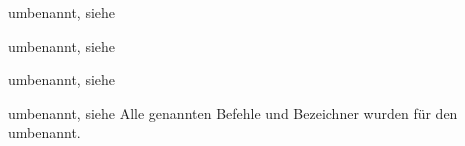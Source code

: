 \begin{Declaration}{}{%
  umbenannt, siehe %
}
\begin{Declaration}{}{%
  umbenannt, siehe %
}
\begin{Declaration}{}{%
  umbenannt, siehe %
}
\begin{Declaration}{}{%
  umbenannt, siehe %
}
\printdeclarationlist*%
%
Alle genannten Befehle und Bezeichner wurden für den \noticename{} umbenannt.
\end{Declaration}
\end{Declaration}
\end{Declaration}
\end{Declaration}
